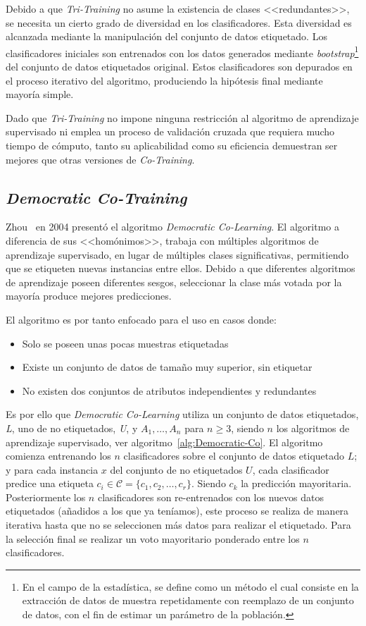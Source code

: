 Debido a que \textit{Tri-Training} no asume la existencia de clases <<redundantes>>, se necesita un cierto grado de diversidad en los clasificadores. Esta diversidad es alcanzada mediante la manipulación del conjunto de datos etiquetado. Los clasificadores iniciales son entrenados con los datos generados mediante \textit{bootstrap}\footnote{En el campo de la estadística, se define como un método el cual consiste en la extracción de datos de muestra repetidamente con reemplazo de un conjunto de datos, con el fin de estimar un parámetro de la población.} del conjunto de datos etiquetados original. Estos clasificadores son depurados en el proceso iterativo del algoritmo, produciendo la hipótesis final mediante mayoría simple.

Dado que \textit{Tri-Training} no impone ninguna restricción al algoritmo de aprendizaje supervisado ni emplea un proceso de validación cruzada que requiera mucho tiempo de cómputo, tanto su aplicabilidad como su eficiencia demuestran ser mejores que otras versiones de \textit{Co-Training}.

\clearpage
\subsection{\textit{Democratic Co-Training}}
Zhou~\cite{zhou2004democratic} en 2004 presentó el algoritmo \textit{Democratic Co-Learning}. El algoritmo a diferencia de sus <<homónimos>>, trabaja con múltiples algoritmos de aprendizaje supervisado, en lugar de múltiples clases significativas, permitiendo que se etiqueten nuevas instancias entre ellos. Debido a que diferentes algoritmos de aprendizaje poseen diferentes sesgos, seleccionar la clase más votada por la mayoría produce mejores predicciones.

El algoritmo es por tanto enfocado para el uso en casos donde:
\begin{itemize}
\item Solo se poseen unas pocas muestras etiquetadas 
\item Existe un conjunto de datos de tamaño muy superior, sin etiquetar
\item No existen dos conjuntos de atributos independientes y redundantes
\end{itemize}

Es por ello que \textit{Democratic Co-Learning} utiliza un conjunto de datos etiquetados, \textit{L}, uno de no etiquetados, \textit{U}, y $A_1,\dots ,A_n$ para $n \geq 3$, siendo $n$ los algoritmos de aprendizaje supervisado, ver algoritmo~\ref{alg:Democratic-Co}. El algoritmo comienza entrenando los $n$ clasificadores sobre el conjunto de datos etiquetado $L$; y para cada instancia $x$ del conjunto de no etiquetados $U$, cada clasificador predice una etiqueta $c_i \in \mathcal{C} = \lbrace c_1, c_2, \dots , c_r\rbrace$. Siendo $c_k$ la predicción mayoritaria. Posteriormente los $n$ clasificadores son re-entrenados con los nuevos datos etiquetados (añadidos a los que ya teníamos), este proceso se realiza de manera iterativa hasta que no se seleccionen más datos para realizar el etiquetado. Para la selección final se realizar un voto mayoritario ponderado entre los $n$ clasificadores. 

